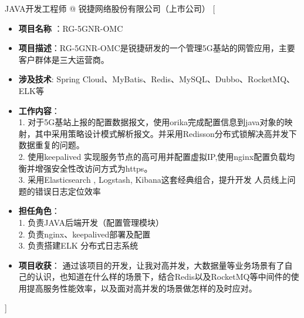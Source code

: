 \documentclass[zh]{resume}
\begin{document}
\begin{experiences}
    {JAVA开发工程师 @ 锐捷网络股份有限公司（上市公司）}%
    [\begin{itemize}
      \item {\bfseries 项目名称} ：RG-5GNR-OMC
      \item {\bfseries 项目描述}：RG-5GNR-OMC是锐捷研发的一个管理5G基站的网管应用，主要客户群体是三大运营商。
      \item {\bfseries 涉及技术}: Spring Cloud、MyBatis、Redis、MySQL、Dubbo、RocketMQ、ELK等
      \item {\bfseries 工作内容}：\\ 
      1. 对于5G基站上报的配置数据报文，使用orika完成配置信息到java对象的映射，其中采用策略设计模式解析报文。并采用Redisson分布式锁解决高并发下数据重复的问题。\\
      2. 使用keepalived 实现服务节点的高可用并配置虚拟IP,使用nginx配置负载均衡并增强安全性改访问方式为https。\\
      3. 采用Elasticsearch , Logstash, Kibana这套经典组合，提升开发	人员线上问题的错误日志定位效率
      \item {\bfseries 担任角色}：\\
      1. 负责JAVA后端开发（配置管理模块）\\
      2. 负责nginx、keepalived部署及配置 \\ 
      3. 负责搭建ELK 分布式日志系统
      \item {\bfseries 项目收获}：
      通过该项目的开发，让我对高并发，大数据量等业务场景有了自己的认识，也知道在什么样的场景下，结合Redis以及RocketMQ等中间件的使用提高服务性能效率，以及面对高并发的场景做怎样的及时应对。
    \end{itemize}]
  
  \separator{0.5ex}


\end{experiences}
\end{document}
